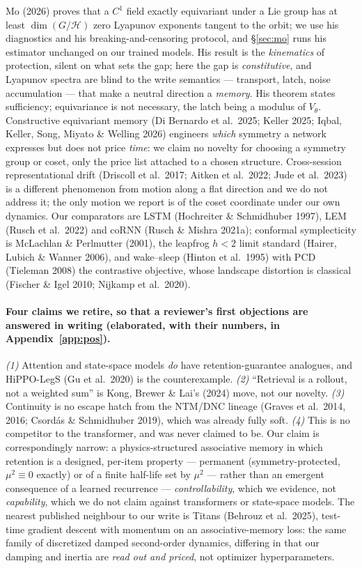 \documentclass{article}
\begin{document}
Mo (2026) proves that a $C^1$ field exactly equivariant under a Lie group has at least $\dim(G/\mathcal H)$ zero Lyapunov exponents tangent to the orbit; we use his diagnostics and his breaking-and-censoring protocol, and \S\ref{sec:mo} runs his estimator unchanged on our trained models. His result is the \emph{kinematics} of protection, silent on what sets the gap; here the gap is \emph{constitutive}, and Lyapunov spectra are blind to the write semantics --- transport, latch, noise accumulation --- that make a neutral direction a \emph{memory}. His theorem states sufficiency; equivariance is not necessary, the latch being a modulus of $V_\theta$. Constructive equivariant memory (Di Bernardo et al.\ 2025; Keller 2025; Iqbal, Keller, Song, Miyato \& Welling 2026) engineers \emph{which} symmetry a network expresses but does not price \emph{time}: we claim no novelty for choosing a symmetry group or coset, only the price list attached to a chosen structure. Cross-session representational drift (Driscoll et al.\ 2017; Aitken et al.\ 2022; Jude et al.\ 2023) is a different phenomenon from motion along a flat direction and we do not address it; the only motion we report is of the coset coordinate under our own dynamics. Our comparators are LSTM (Hochreiter \& Schmidhuber 1997), LEM (Rusch et al.\ 2022) and coRNN (Rusch \& Mishra 2021a); conformal symplecticity is McLachlan \& Perlmutter (2001), the leapfrog $h<2$ limit standard (Hairer, Lubich \& Wanner 2006), and wake--sleep (Hinton et al.\ 1995) with PCD (Tieleman 2008) the contrastive objective, whose landscape distortion is classical (Fischer \& Igel 2010; Nijkamp et al.\ 2020).

{\footnotesize\paragraph{Four claims we retire, so that a reviewer's first objections are answered in writing (elaborated, with their numbers, in Appendix~\ref{app:pos}).} \emph{(1)} Attention and state-space models \emph{do} have retention-guarantee analogues, and HiPPO-LegS (Gu et al.\ 2020) is the counterexample. \emph{(2)} ``Retrieval is a rollout, not a weighted sum'' is Kong, Brewer \& Lai's (2024) move, not our novelty. \emph{(3)} Continuity is no escape hatch from the NTM/DNC lineage (Graves et al.\ 2014, 2016; Csord\'as \& Schmidhuber 2019), which was already fully soft. \emph{(4)} This is no competitor to the transformer, and was never claimed to be. Our claim is correspondingly narrow: a physics-structured associative memory in which retention is a designed, per-item property --- permanent (symmetry-protected, $\mu^2\equiv0$ exactly) or of a finite half-life set by $\mu^2$ --- rather than an emergent consequence of a learned recurrence --- \emph{controllability}, which we evidence, not \emph{capability}, which we do not claim against transformers or state-space models. The nearest published neighbour to our write is Titans (Behrouz et al.\ 2025), test-time gradient descent with momentum on an associative-memory loss: the same family of discretized damped second-order dynamics, differing in that our damping and inertia are \emph{read out and priced}, not optimizer hyperparameters.\par}
\end{document}
